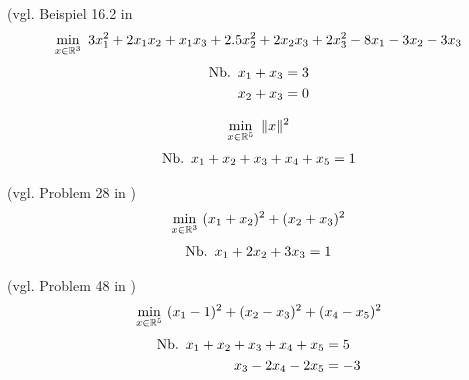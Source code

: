 \begin{testproblem}
(vgl. Beispiel 16.2 in \cite[S.~452]{nocedal}
\begin{equation}
\min_{x\in\mathbb{R}^3}\ 3 x_1^2 + 2 x_1 x_2 + x_1 x_3 + 2.5 x_2^2 + 2 x_2 x_3 + 2 x_3^2 - 8 x_1 - 3 x_2 - 3 x_3
\end{equation}
\begin{equation*}
\begin{split}
\nb x_1 + x_3 & = 3 \\
x_2 + x_3 & = 0 \\
\end{split}
\end{equation*}
\end{testproblem}

\begin{testproblem}
\begin{equation}
\min_{x\in\mathbb{R}^5}\ \| x \|^2
\end{equation}
\begin{equation*}
\begin{split}
\nb x_1 + x_2 + x_3 + x_4 + x_5 & = 1 \\
\end{split}
\end{equation*}
\end{testproblem}

\begin{testproblem}
(vgl. Problem 28 in \cite[S.~51]{hock})
\begin{equation}
\min_{x\in\mathbb{R}^3}\ (x_1 + x_2)^2 + (x_2 + x_3)^2
\end{equation}
\begin{equation*}
\begin{split}
\nb x_1 + 2 x_2 + 3 x_3 & = 1 \\
\end{split}
\end{equation*}
\end{testproblem}

\begin{testproblem}
(vgl. Problem 48 in \cite[S.~71]{hock})
\begin{equation}
\min_{x\in\mathbb{R}^5}\ (x_1 - 1)^2 + (x_2 - x_3)^2 + (x_4 - x_5)^2
\end{equation}
\begin{equation*}
\begin{split}
\nb x_1 + x_2 + x_3 + x_4 + x_5 & = 5 \\
x_3 - 2 x_4 - 2 x_5 & = -3 \\
\end{split}
\end{equation*}
\end{testproblem}

